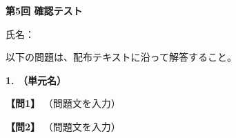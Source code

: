 
\begin{center}
{\Large\textbf{第5回 確認テスト}}
\end{center}
\vspace{0.15em}
\begin{flushright}
氏名：\testnameblank
\end{flushright}
\vspace{0.25em}
\noindent 以下の問題は、配布テキストに沿って解答すること。
\vspace{0.35em}

\noindent\textbf{1. （単元名）}

\noindent\textbf{【問1】} （問題文を入力）
\testqsep

\noindent\textbf{【問2】} （問題文を入力）
\testqsep
